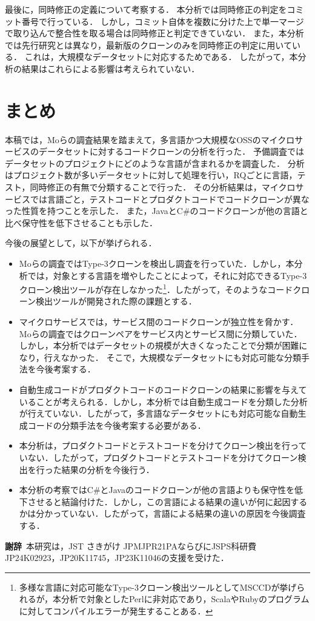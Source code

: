 \documentclass[T,J]{fose}
\begin{document}
最後に，同時修正の定義について考察する．
本分析では同時修正の判定をコミット番号で行っている．
しかし，コミット自体を複数に分けた上で単一マージで取り込んで整合性を取る場合は同時修正と判定できていない．
また，本分析では先行研究\cite{mo2021existence}とは異なり，最新版のクローンのみを同時修正の判定に用いている．
これは，大規模なデータセットに対応するためである．
したがって，本分析の結果はこれらによる影響は考えられていない．


\section{まとめ}
本稿では，Moらの調査結果を踏まえて，多言語かつ大規模なOSSのマイクロサービスのデータセットに対するコードクローンの分析を行った\cite{mo2021existence}．
予備調査ではデータセットのプロジェクトにどのような言語が含まれるかを調査した．
分析はプロジェクト数が多いデータセットに対して処理を行い，RQごとに言語，テスト，同時修正の有無で分類することで行った．
その分析結果は，マイクロサービスでは言語ごと，テストコードとプロダクトコードでコードクローンが異なった性質を持つことを示した．
また，JavaとC\#のコードクローンが他の言語と比べ保守性を低下させることも示した．

今後の展望として，以下が挙げられる．
\begin{itemize}
    \item%
    Moらの調査ではType-3クローンを検出し調査を行っていた．しかし，本分析では，対象とする言語を増やしたことによって，それに対応できるType-3クローン検出ツールが存在しなかった\footnote{多様な言語に対応可能なType-3クローン検出ツールとしてMSCCD\cite{MSCCD}が挙げられるが，本分析で対象としたPerlに非対応であり，ScalaやRubyのプログラムに対してコンパイルエラーが発生することある．}．したがって，そのようなコードクローン検出ツールが開発された際の課題とする．
    \item%
    マイクロサービスでは，サービス間のコードクローンが独立性を脅かす．Moらの調査ではクローンペアをサービス内とサービス間に分類していた．しかし，本分析ではデータセットの規模が大きくなったことで分類が困難になり，行えなかった． そこで，大規模なデータセットにも対応可能な分類手法を今後考案する．
    \item%
    自動生成コードがプロダクトコードのコードクローンの結果に影響を与えていることが考えられる．しかし，本分析では自動生成コードを分類した分析が行えていない．したがって，多言語なデータセットにも対応可能な自動生成コードの分類手法を今後考案する必要がある．
    \item%
    本分析は，プロダクトコードとテストコードを分けてクローン検出を行っていない．したがって，プロダクトコードとテストコードを分けてクローン検出を行った結果の分析を今後行う．
    \item%
    本分析の考察ではC\#とJavaのコードクローンが他の言語よりも保守性を低下させると結論付けた．しかし，この言語による結果の違いが何に起因するかは分かっていない．したがって，言語による結果の違いの原因を今後調査する．
\end{itemize}

\textbf{謝辞}\
本研究は，JST さきがけ JPMJPR21PAならびにJSPS科研費 JP24K02923，JP20K11745，JP23K11046の支援を受けた．



\end{document}
